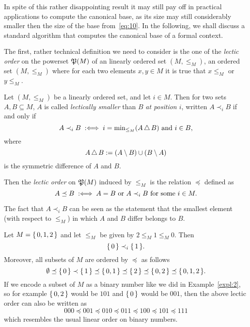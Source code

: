 In spite of this rather disappointing result it may still pay off in practical
applications to compute the canonical base, as its size may still considerably smaller
then the size of the base from~\eqref{eq:10}.  In the following, we shall discuss a
standard algorithm that computes the canonical base of a formal context.

The first, rather technical definition we need to consider is the one of the \emph{lectic
  order} on the powerset ${\mathfrak{P}(M)}$ of an linearly ordered set $(M, \leq_M)$, \ie an
ordered set $(M, \leq_M)$ where for each two elements $x, y \in M$ it is true that $x
\leq_M$ or $y \leq_M$.

\begin{Definition}
  \label{def:lectic-order}
  Let $(M, \leq_M)$ be a linearly ordered set, and let $i \in M$.  Then for two sets $A, B
  \subseteq M$, $A$ is called \emph{lectically smaller} than $B$ \emph{at position $i$},
  written $A \prec_i B$ if and only if
  \begin{equation*}
    A \prec_i B \;:\Longleftrightarrow\; i = \min\nolimits_{\leq_M}(A \mathop\triangle B) \text{ and } i \in B,
  \end{equation*}
  where
  \begin{equation*}
    A \mathop\triangle B := (A \setminus B) \cup (B \setminus A)
  \end{equation*}
  is the symmetric difference of $A$ and $B$.

  Then the \emph{lectic order} on ${\mathfrak{P}(M)}$ induced by $\leq_M$ is the relation
  $\preceq$ defined as
  \begin{equation*}
    A \preceq B \;:\Longleftrightarrow\; A = B \text{ or } A \prec_i B \text{ for some } i \in M.
  \end{equation*}
\end{Definition}

The fact that $A \prec_i B$ can be seen as the statement that the smallest element (with
respect to $\leq_M$) in which $A$ and $B$ differ belongs to $B$.

\begin{Example}
  Let $M = {\{\, 0, 1, 2 \,\}}$ and let $\leq_M$ be given by $2 \leq_M 1 \leq_M 0$.  Then
  \begin{equation*}
    {\ensuremath{\{\,0\,\}}} \prec_i {\{\,1\,\}}.
  \end{equation*}
  Moreover, all subsets of $M$ are ordered by $\preceq$ as follows
  \begin{equation*}
    \emptyset \preceq {\ensuremath{\{\,0\,\}}} \prec {\ensuremath{\{\,1\,\}}} \preceq {\ensuremath{\{\,0, 1\,\}}} \preceq {\ensuremath{\{\,2\,\}}} \preceq
    {\ensuremath{\{\,0, 2\,\}}} \preceq {\ensuremath{\{\,0, 1, 2\,\}}}.
  \end{equation*}
  If we encode a subset of $M$ as a binary number like we did in Example~\ref{expl:2}, so
  for example ${\{\,0, 2\,\}}$ would be $101$ and ${\{\,0\,\}}$ would be $001$, then the above
  lectic order can also be written as
  \begin{equation*}
    000 \preceq 001 \preceq 010 \preceq 011 \preceq 100 \preceq 101 \preceq 111
  \end{equation*}
  which resembles the usual linear order on binary numbers.
\end{Example}


